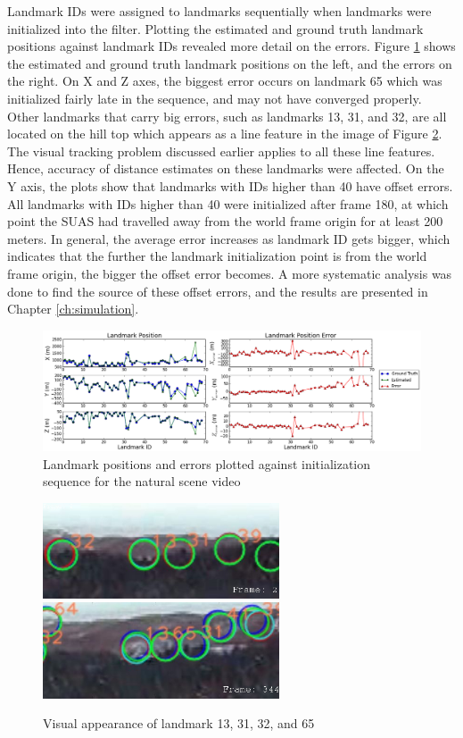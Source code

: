 Landmark IDs were assigned to landmarks sequentially when landmarks
were initialized into the filter. Plotting the estimated and ground
truth landmark positions against landmark IDs revealed more detail on
the errors. Figure \ref{fltfig:9} shows the estimated and ground truth
landmark positions on the left, and the errors on the right. On X and Z
axes, the biggest error occurs on landmark 65 which was
initialized fairly late in the sequence, and may not have converged
properly. Other landmarks that carry big errors, such as landmarks
13, 31, and 32, are all located on the hill top which appears as a line
feature in the image of Figure \ref{fltfig:line_features}. The visual
tracking problem discussed earlier applies to all these line features.
Hence, accuracy of distance estimates on these landmarks were
affected. On the Y axis, the plots show that landmarks with IDs higher
than 40 have offset errors. All landmarks with IDs higher than 40
were initialized after frame 180, at which point the SUAS had
travelled away from the world frame origin for at least 200 meters.
In general, the average error increases as landmark ID gets bigger, which indicates
that the further the landmark initialization point is from the world
frame origin, the bigger the offset error becomes. A more systematic
analysis was done to find the source of these offset errors, and the
results are presented in Chapter \ref{ch:simulation}.

\begin{figure}[h]
\centering
\includegraphics[width=16cm, keepaspectratio=true]
{./Figures/fltfig/cut1/Figure60.png}
\caption{Landmark positions and errors plotted against initialization
  sequence for the natural scene video}
\label{fltfig:9}
\end{figure}

\begin{figure}[h]
\centering
\includegraphics[width=7cm, keepaspectratio=true]
{./Figures/fltfig/landmark_13_31_32.jpg}
\includegraphics[width=7cm, keepaspectratio=true]
{./Figures/fltfig/landmark_13_65_32.jpg}
\caption{Visual appearance of landmark 13, 31, 32, and 65}
\label{fltfig:line_features}
\end{figure}

